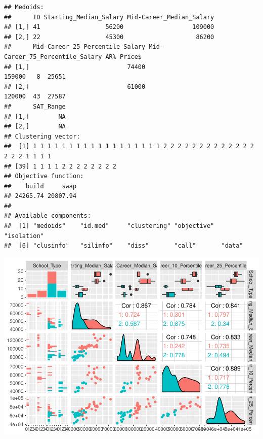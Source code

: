\documentclass[]{article}
\newenvironment{Shaded}{\begin{snugshade}}{\end{snugshade}}
\newcommand{\KeywordTok}[1]{\textcolor[rgb]{0.13,0.29,0.53}{\textbf{#1}}}
\newcommand{\DataTypeTok}[1]{\textcolor[rgb]{0.13,0.29,0.53}{#1}}
\newcommand{\DecValTok}[1]{\textcolor[rgb]{0.00,0.00,0.81}{#1}}
\newcommand{\StringTok}[1]{\textcolor[rgb]{0.31,0.60,0.02}{#1}}
\newcommand{\OperatorTok}[1]{\textcolor[rgb]{0.81,0.36,0.00}{\textbf{#1}}}
\newcommand{\NormalTok}[1]{#1}
\begin{document}
\begin{verbatim}
## Medoids:
##      ID Starting_Median_Salary Mid-Career_Median_Salary
## [1,] 41                  56200                   109000
## [2,] 22                  45300                    86200
##      Mid-Career_25_Percentile_Salary Mid-Career_75_Percentile_Salary AR% Price$
## [1,]                           74400                          159000   8  25651
## [2,]                           61000                          120000  43  27587
##      SAT_Range
## [1,]        NA
## [2,]        NA
## Clustering vector:
##  [1] 1 1 1 1 1 1 1 1 1 1 1 1 1 1 1 1 1 1 2 2 2 2 2 2 2 2 2 2 2 2 2 2 2 2 1 1 1 1
## [39] 1 1 1 1 2 2 2 2 2 2 2 2
## Objective function:
##    build     swap 
## 24265.74 20807.94 
## 
## Available components:
##  [1] "medoids"    "id.med"     "clustering" "objective"  "isolation" 
##  [6] "clusinfo"   "silinfo"    "diss"       "call"       "data"
\end{verbatim}

\begin{Shaded}
\end{Shaded}

\begin{center}\includegraphics{project1_files/figure-latex/unnamed-chunk-5-8} \end{center}
\end{document}
